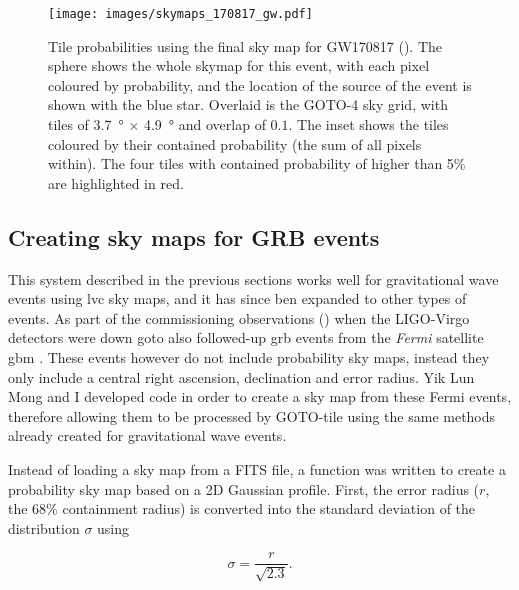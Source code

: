 \begin{colsection}
\begin{colsection}
\begin{figure}[p]
\begin{center}
\texttt{[image: images/skymaps\_170817\_gw.pdf]}
\end{center}
\caption[Tile probabilities for GW170817]{Tile probabilities using the final sky map for GW170817 (\cite{GW170817}). The sphere shows the whole skymap for this event, with each pixel coloured by probability, and the location of the source of the event is shown with the blue star. Overlaid is the GOTO-4 sky grid, with tiles of \SI{3.7}{\degree} $\times$ \SI{4.9}{\degree} and overlap of $0.1$. The inset shows the tiles coloured by their contained probability (the sum of all pixels within). The four tiles with contained probability of higher than 5\% are highlighted in red.
}
\label{fig:170817_gw}
\end{figure}

\clearpage

\end{colsection}


\subsection{Creating sky maps for GRB events}
\label{sec:gaussian_skymaps}
\begin{colsection}

This system described in the previous sections works well for gravitational wave events using \gls{lvc} sky maps, and it has since ben expanded to other types of events. As part of the commissioning observations () when the LIGO-Virgo detectors were down \gls{goto} also followed-up \gls{grb} events from the \textit{Fermi} satellite \gls{gbm} \citep{Fermi_GBM}. These events however do not include probability sky maps, instead they only include a central right ascension, declination and error radius. Yik Lun Mong and I developed code in order to create a sky map from these Fermi events, therefore allowing them to be processed by GOTO-tile using the same methods already created for gravitational wave events.

Instead of loading a sky map from a FITS file, a function was written to create a probability sky map based on a 2D Gaussian profile. First, the error radius ($r$, the 68\% containment radius) is converted into the standard deviation of the distribution $\sigma$ using

\begin{equation}
    \sigma = \frac{r}{\sqrt{2.3}}.
    \label{eq:gaussian_sigma}
\end{equation}


\end{colsection}
\end{colsection}
